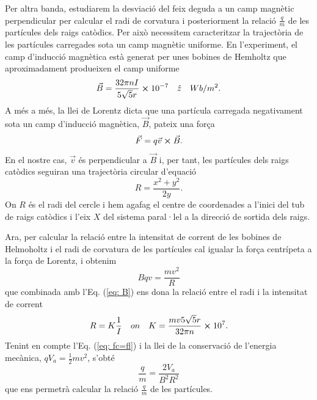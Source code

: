 \documentclass[11pt]{article}
\numberwithin{equation}{section}
\numberwithin{figure}{section}
\numberwithin{table}{section}
\begin{document}
\vspace{1cm}
Per altra banda, estudiarem la desviació del feix deguda a un camp magnètic perpendicular per calcular el radi de corvatura i posteriorment la relació $\frac{q}{m}$ de les partícules dels raigs catòdics. Per això necessitem caracteritzar la trajectòria de les partícules carregades sota un camp magnètic uniforme. En l'experiment, el camp d'inducció magnètica està generat per unes bobines de Hemholtz que aproximadament produeixen el camp uniforme 
\begin{equation}
    \vec{B}=\frac{32\pi nI}{5\sqrt{5}r}\cross10^{-7} \quad \hat{z}\quad Wb/m^2.
    \label{eq: B}
\end{equation}
A més a més, la llei de Lorentz dicta que una partícula carregada negativament sota un camp d'inducció magnètica, $\vec{B}$, pateix una força
\begin{equation}
    \vec{F}=q\vec{v}\cross\vec{B}.
    \label{eq: Lorentz} 
\end{equation} 
En el nostre cas, $\vec{v}$ és perpendicular a $\vec{B }$ i, per tant, les partícules dels raigs catòdics seguiran una trajectòria circular d'equació
\begin{equation}
    R=\frac{x^2+y^2}{2y}.
    \label{eq: radi}
\end{equation}
On $R$ és el radi del cercle i hem agafag el centre de coordenades a l'inici del tub de raigs catòdics i l'eix $X$ del sistema paral·lel a la direcció de sortida dels raigs.

Ara, per calcular la relació entre la intensitat de corrent de les bobines de Helmoholtz i el radi de corvatura de les partícules cal igualar la força centrípeta a la força de Lorentz, i obtenim 
\begin{equation}
    Bqv=\frac{mv^2}{R}
    \label{eq: fc=fl}
\end{equation}
que combinada amb l'Eq. (\ref{eq: B}) ens dona la relació entre el radi i la intensitat de corrent
\begin{equation}
    R=K\frac{1}{I} \quad on \quad K=\frac{mv5\sqrt{5}r}{32\pi n}\cross 10^7.
    \label{eq: IvsR}
\end{equation}
Tenint en compte l'Eq. (\ref{eq: fc=fl}) i la llei de la conservació de l'energia mecànica, $qV_a = \frac{1}{2}mv^2$, s'obté 
\begin{equation}
    \frac{q}{m}=\frac{2V_a }{B^2R^2}
    \label{eq: q/m}
\end{equation}
que ens permetrà calcular la relació $\frac{q}{m}$ de les partícules.
\end{document}
